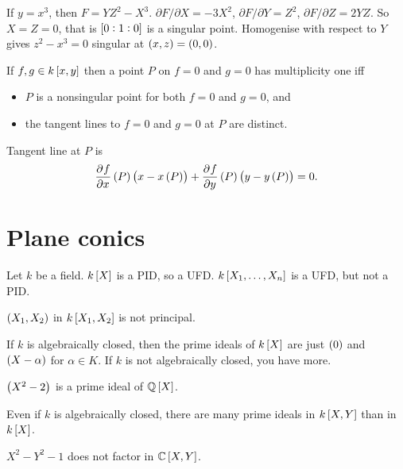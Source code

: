 \begin{example*}
If $ y = x^3 $, then $ F = YZ^2 - X^3 $. $ \partial F / \partial X = -3X^2 $, $ \partial F / \partial Y = Z^2 $, $ \partial F / \partial Z = 2YZ $. So $ X = Z = 0 $, that is $ \sbr{0 : 1 : 0} $ is a singular point. Homogenise with respect to $ Y $ gives $ z^2 - x^3 = 0 $ singular at $ \br{x, z} = \br{0, 0} $.
\end{example*}

\begin{theorem}
\label{thm:2.10}
If $ f, g \in k\sbr{x, y} $ then a point $ P $ on $ f = 0 $ and $ g = 0 $ has multiplicity one iff
\begin{itemize}
\item $ P $ is a nonsingular point for both $ f = 0 $ and $ g = 0 $, and
\item the tangent lines to $ f = 0 $ and $ g = 0 $ at $ P $ are distinct.
\end{itemize}
Tangent line at $ P $ is
$$ \dpd{f}{x}\br{P}\br{x - x\br{P}} + \dpd{f}{y}\br{P}\br{y - y\br{P}} = 0. $$
\end{theorem}

\pagebreak

\section{Plane conics}

Let $ k $ be a field. $ k\sbr{X} $ is a PID, so a UFD. $ k\sbr{X_1, \dots, X_n} $ is a UFD, but not a PID.

\begin{example*}
$ \br{X_1, X_2} $ in $ k\sbr{X_1, X_2} $ is not principal.
\end{example*}

If $ k $ is algebraically closed, then the prime ideals of $ k\sbr{X} $ are just $ \br{0} $ and $ \br{X - \alpha} $ for $ \alpha \in K $. If $ k $ is not algebraically closed, you have more.

\begin{example*}
$ \br{X^2 - 2} $ is a prime ideal of $ \Q\sbr{X} $.
\end{example*}

Even if $ k $ is algebraically closed, there are many prime ideals in $ k\sbr{X, Y} $ than in $ k\sbr{X} $.

\begin{example*}
$ X^2 - Y^2 - 1 $ does not factor in $ \C\sbr{X, Y} $.
\end{example*}

